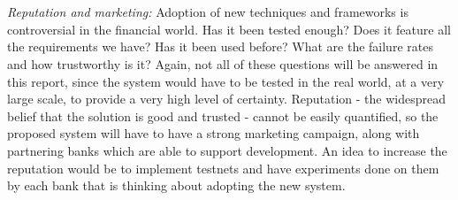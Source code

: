 \documentclass[12pt,twoside]{article}
\begin{document}
\\ \\
\textit{Reputation and marketing:} Adoption of new techniques and frameworks is controversial in the financial world. Has it been tested enough? Does it feature all the requirements we have? Has it been used before? What are the failure rates and how trustworthy is it? Again, not all of these questions will be answered in this report, since the system would have to be tested in the real world, at a very large scale, to provide a very high level of certainty. Reputation - the widespread belief that the solution is good and trusted - cannot be easily quantified, so the proposed system will have to have a strong marketing campaign, along with partnering banks which are able to support development. An idea to increase the reputation would be to implement testnets and have experiments done on them by each bank that is thinking about adopting the new system.
\end{document}
